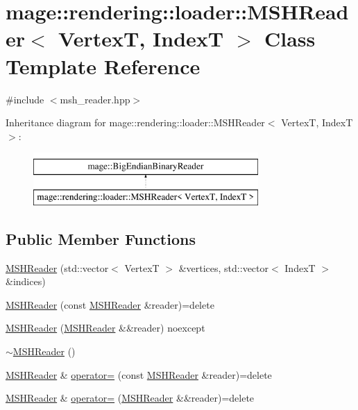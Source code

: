 \hypertarget{classmage_1_1rendering_1_1loader_1_1_m_s_h_reader}{}\section{mage\+:\+:rendering\+:\+:loader\+:\+:M\+S\+H\+Reader$<$ VertexT, IndexT $>$ Class Template Reference}
\label{classmage_1_1rendering_1_1loader_1_1_m_s_h_reader}


{\ttfamily \#include $<$msh\+\_\+reader.\+hpp$>$}

Inheritance diagram for mage\+:\+:rendering\+:\+:loader\+:\+:M\+S\+H\+Reader$<$ VertexT, IndexT $>$\+:\begin{figure}[H]
\begin{center}
\leavevmode
\includegraphics[height=2.000000cm]{classmage_1_1rendering_1_1loader_1_1_m_s_h_reader}
\end{center}
\end{figure}
\subsection*{Public Member Functions}
\begin{DoxyCompactItemize}
\item 
\hyperlink{classmage_1_1rendering_1_1loader_1_1_m_s_h_reader_adf50a71f368cd580433b3dab5ea3a1ac}{M\+S\+H\+Reader} (std\+::vector$<$ VertexT $>$ \&vertices, std\+::vector$<$ IndexT $>$ \&indices)
\item 
\hyperlink{classmage_1_1rendering_1_1loader_1_1_m_s_h_reader_ae16a36afbfe65791cdfe8dadd6b57af2}{M\+S\+H\+Reader} (const \hyperlink{classmage_1_1rendering_1_1loader_1_1_m_s_h_reader}{M\+S\+H\+Reader} \&reader)=delete
\item 
\hyperlink{classmage_1_1rendering_1_1loader_1_1_m_s_h_reader_a107ac854c231c1a1c39f30c5199dcec7}{M\+S\+H\+Reader} (\hyperlink{classmage_1_1rendering_1_1loader_1_1_m_s_h_reader}{M\+S\+H\+Reader} \&\&reader) noexcept
\item 
\hyperlink{classmage_1_1rendering_1_1loader_1_1_m_s_h_reader_af45daf383d4e94586b5d2968d5357fce}{$\sim$\+M\+S\+H\+Reader} ()
\item 
\hyperlink{classmage_1_1rendering_1_1loader_1_1_m_s_h_reader}{M\+S\+H\+Reader} \& \hyperlink{classmage_1_1rendering_1_1loader_1_1_m_s_h_reader_a106e5a6cce46777cf7ae36cb4034e1a0}{operator=} (const \hyperlink{classmage_1_1rendering_1_1loader_1_1_m_s_h_reader}{M\+S\+H\+Reader} \&reader)=delete
\item 
\hyperlink{classmage_1_1rendering_1_1loader_1_1_m_s_h_reader}{M\+S\+H\+Reader} \& \hyperlink{classmage_1_1rendering_1_1loader_1_1_m_s_h_reader_a8764164f7e0f78938c5e303d13e0f64d}{operator=} (\hyperlink{classmage_1_1rendering_1_1loader_1_1_m_s_h_reader}{M\+S\+H\+Reader} \&\&reader)=delete
\end{DoxyCompactItemize}
